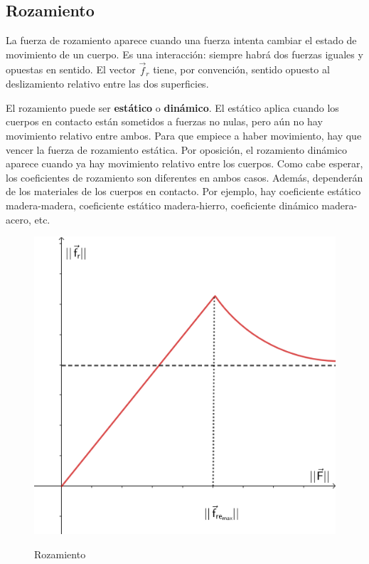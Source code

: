 \documentclass{article}
\begin{document}
\subsection{Rozamiento}

La fuerza de rozamiento aparece cuando una fuerza intenta cambiar el estado de movimiento de un cuerpo. Es una interacción: siempre habrá dos fuerzas iguales y opuestas en sentido. El vector $\vec{f}_r$ tiene, por convención, sentido opuesto al deslizamiento relativo entre las dos superficies.

El rozamiento puede ser \textbf{estático} o \textbf{dinámico}. El estático aplica cuando los cuerpos en contacto están sometidos a fuerzas no nulas, pero aún no hay movimiento relativo entre ambos. Para que empiece a haber movimiento, hay que vencer la fuerza de rozamiento estática. Por oposición, el rozamiento dinámico aparece cuando ya hay movimiento relativo entre los cuerpos. Como cabe esperar, los coeficientes de rozamiento son diferentes en ambos casos. Además, dependerán de los materiales de los cuerpos en contacto. Por ejemplo, hay coeficiente estático madera-madera, coeficiente estático madera-hierro, coeficiente dinámico madera-acero, etc.

\begin{figure}[ht]
\centering
\caption{Rozamiento}
\includegraphics[scale=3.0]{../../common/img/62.01/theory/06-dynamics-friction.png}
\label{fig:friction}
\end{figure}
\end{document}
